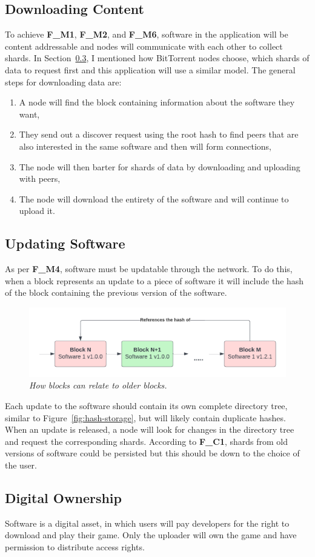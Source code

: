 \subsection{Downloading Content}

To achieve \textbf{F\_M1}, \textbf{F\_M2}, and \textbf{F\_M6}, software in the application will be content addressable and nodes will communicate with each other to collect shards. In Section~\ref{}, I mentioned how BitTorrent nodes choose, which shards of data to request first and this application will use a similar model. The general steps for downloading data are:

\begin{enumerate}
  \item A node will find the block containing information about the software they want,
  \item They send out a discover request using the root hash to find peers that are also interested in the same software and then will form connections,
  \item The node will then barter for shards of data by downloading and uploading with peers,
  \item The node will download the entirety of the software and will continue to upload it.
\end{enumerate}

\subsection{Updating Software}

As per \textbf{F\_M4}, software must be updatable through the network. To do this, when a block represents an update to a piece of software it will include the hash of the block containing the previous version of the software.

\begin{figure}[ht]
  \centering
  \includegraphics[width=.85\textwidth]{diagrams/update-software.png}
  \caption{\textit{How blocks can relate to older blocks.}}
\end{figure}

Each update to the software should contain its own complete directory tree, similar to Figure~\ref{fig:hash-storage}, but will likely contain duplicate hashes. When an update is released, a node will look for changes in the directory tree and request the corresponding shards. According to \textbf{F\_C1}, shards from old versions of software could be persisted but this should be down to the choice of the user.

\subsection{Digital Ownership}

Software is a digital asset, in which users will pay developers for the right to download and play their game. Only the uploader will own the game and have permission to distribute access rights. 